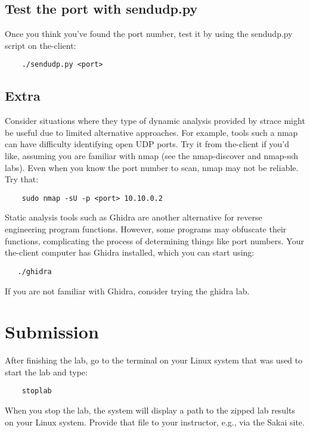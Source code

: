 \subsection{Test the port with sendudp.py}
Once you think you've found the port number, test it by using the sendudp.py script on the-client:
\begin{verbatim}
    ./sendudp.py <port>
\end{verbatim}

\subsection{Extra}
Consider situations where they type of dynamic analysis provided by strace might be useful due to limited alternative approaches.
For example, tools such a nmap can have difficulty identifying open UDP ports.  Try it from the-client if you'd like, assuming you
are familiar with nmap (see the nmap-discover and nmap-ssh labs).
Even when you know the port number to scan, nmap may not be reliable.  Try that:
\begin{verbatim}
    sudo nmap -sU -p <port> 10.10.0.2
\end{verbatim}
Static analysis tools such as Ghidra are another alternative for reverse engineering program functions.  However, some programs
may obfuscate their functions, complicating the process of determining things like port numbers.  
Your the-client computer has Ghidra installed, which you can start using:
\begin{verbatim}
   ./ghidra
\end{verbatim}
If you are not familiar with Ghidra, consider trying the ghidra lab.

\section{Submission}
After finishing the lab, go to the terminal on your Linux system that was used to start the lab and type:
\begin{verbatim}
    stoplab 
\end{verbatim}
When you stop the lab, the system will display a path to the zipped lab results on your Linux system.  Provide that file to 
your instructor, e.g., via the Sakai site.

\copyrightnotice


